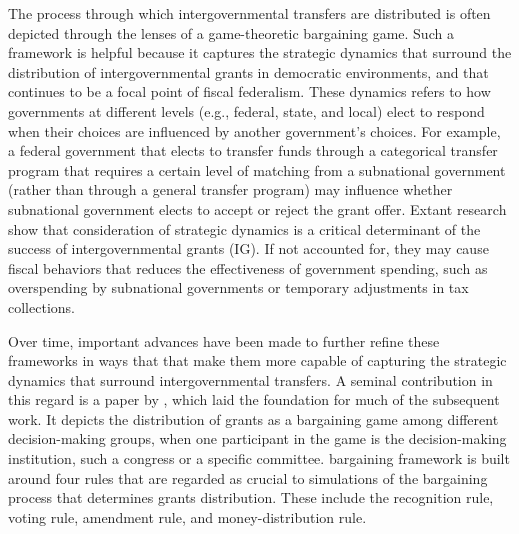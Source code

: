 The process through which intergovernmental transfers are distributed is often depicted through the lenses of a game-theoretic bargaining game. Such a framework is helpful because it captures the strategic dynamics that surround the distribution of intergovernmental grants in democratic environments, and that continues to be a focal point of fiscal federalism\parencite{agrawal2022local,dahlby1996fiscal,gordon1983optimal}. These dynamics refers to how governments at different levels (e.g., federal, state, and local) elect to respond when their choices are influenced by another government's choices.  For example, a federal government that elects to transfer funds through a categorical transfer program that requires a certain level of matching from a subnational government (rather than through a general transfer program) may influence whether subnational government elects to accept or reject the grant offer. Extant research show that consideration of strategic dynamics is a critical determinant of the success of intergovernmental grants (IG)\parencite{dahlby1996fiscal,gordon1983optimal}. If not accounted for, they may cause fiscal behaviors that reduces the effectiveness of government spending, such as overspending by subnational governments or temporary adjustments in tax collections\parencite{bailey1998flypaper,inman2008flypaper,turnbull1998overspending}.

Over time, important advances have been made to further refine these frameworks in ways that that make them more capable of capturing the strategic dynamics that surround intergovernmental transfers. A seminal contribution in this regard is a paper by \textcite{baron1989bargaining}, which laid the foundation for much of the subsequent work. It depicts the distribution of grants as a bargaining game among different decision-making groups, when one participant in the game is the decision-making institution, such a congress or a specific committee. \textcite{baron1989bargaining} bargaining framework is built around four rules that are regarded as crucial to simulations of the bargaining process that determines grants distribution. These include the recognition rule, voting rule, amendment rule, and money-distribution rule.



